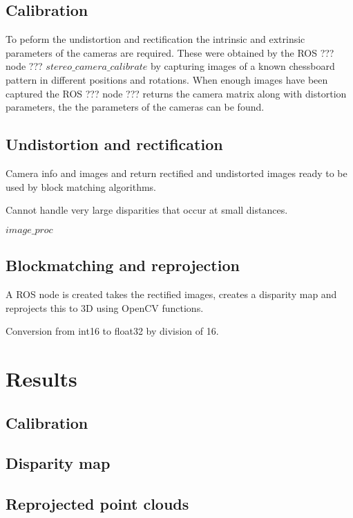 \subsection{Calibration}

To peform the undistortion and rectification the intrinsic and extrinsic parameters of the cameras are required. These were obtained by the ROS ??? node ??? $stereo\_camera\_calibrate$ by capturing images of a known chessboard pattern in different positions and rotations. When enough images have been captured the ROS ??? node ??? returns the camera matrix along with distortion parameters, the    the parameters of the cameras can be found.

\subsection{Undistortion and rectification}



Camera info and images and return rectified and undistorted images ready to be used by block matching algorithms.

Cannot handle very large disparities that occur at small distances. 

$image\_proc$

\subsection{Blockmatching and reprojection}

A ROS node is created takes the rectified images, creates a disparity map and reprojects this to 3D using OpenCV functions.

Conversion from int16 to float32 by division of 16.

\section{Results}
\subsection{Calibration}
\subsection{Disparity map}
\subsection{Reprojected point clouds}


